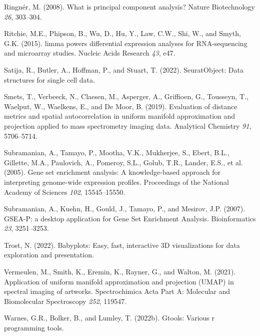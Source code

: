 \documentclass[
  parskip,
  oneside]{scrreprt}
\newlength{\cslhangindent}
\newlength{\cslentryspacingunit} %
\newenvironment{CSLReferences}[2] %
 {%
  \setlength{\parindent}{0pt}
  \ifodd #1
  \let\oldpar\par
  \def\par{\hangindent=\cslhangindent\oldpar}
  \fi
  \setlength{\parskip}{#2\cslentryspacingunit}
 }%
 {}
\begin{document}
\begin{CSLReferences}{0}{0}
\leavevmode{}%
Ringnér, M. (2008). What is principal component analysis? Nature
Biotechnology \emph{26}, 303--304.

\leavevmode{}%
Ritchie, M.E., Phipson, B., Wu, D., Hu, Y., Law, C.W., Shi, W., and
Smyth, G.K. (2015). {limma} powers differential expression analyses for
{RNA}-sequencing and microarray studies. Nucleic Acids Research
\emph{43}, e47.

\leavevmode{}%
Satija, R., Butler, A., Hoffman, P., and Stuart, T. (2022).
SeuratObject: Data structures for single cell data.

\leavevmode{}%
Smets, T., Verbeeck, N., Claesen, M., Asperger, A., Griffioen, G.,
Tousseyn, T., Waelput, W., Waelkens, E., and De Moor, B. (2019).
Evaluation of distance metrics and spatial autocorrelation in uniform
manifold approximation and projection applied to mass spectrometry
imaging data. Analytical Chemistry \emph{91}, 5706--5714.

\leavevmode{}%
Subramanian, A., Tamayo, P., Mootha, V.K., Mukherjee, S., Ebert, B.L.,
Gillette, M.A., Paulovich, A., Pomeroy, S.L., Golub, T.R., Lander, E.S.,
et al. (2005). Gene set enrichment analysis: A knowledge-based approach
for interpreting genome-wide expression profiles. Proceedings of the
National Academy of Sciences \emph{102}, 15545--15550.

\leavevmode{}%
Subramanian, A., Kuehn, H., Gould, J., Tamayo, P., and Mesirov, J.P.
(2007). {GSEA-P: a desktop application for Gene Set Enrichment
Analysis}. Bioinformatics \emph{23}, 3251--3253.

\leavevmode{}%
Trost, N. (2022). Babyplots: Easy, fast, interactive 3D visualizations
for data exploration and presentation.

\leavevmode{}%
Vermeulen, M., Smith, K., Eremin, K., Rayner, G., and Walton, M. (2021).
Application of uniform manifold approximation and projection (UMAP) in
spectral imaging of artworks. Spectrochimica Acta Part A: Molecular and
Biomolecular Spectroscopy \emph{252}, 119547.

\leavevmode{}%
Warnes, G.R., Bolker, B., and Lumley, T. (2022b). Gtools: Various r
programming tools.


\end{CSLReferences}
\end{document}

